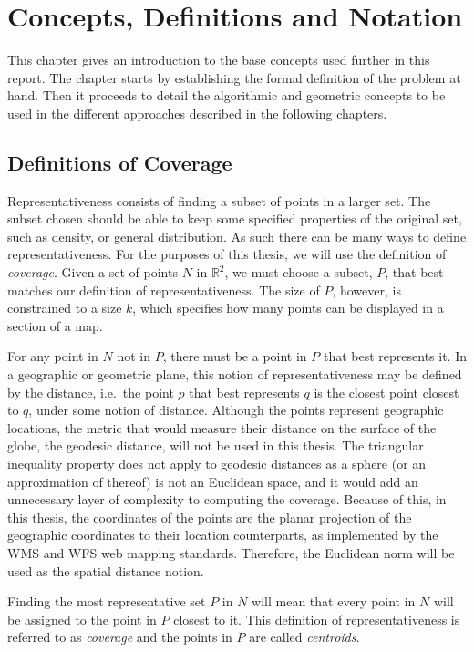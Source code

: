 \chapter{Concepts, Definitions and Notation}
\label{chap:theory}
This chapter gives an introduction to the base concepts used further in this report.
The chapter starts by establishing the formal definition of the problem at hand. 
Then it proceeds to detail the algorithmic and geometric concepts to be used in the different approaches described in the following chapters.
\section{Definitions of Coverage}
\label{sect:problem}
Representativeness consists of finding a subset of points in a larger set. The subset chosen should be able to keep some specified properties of the original set, such as density, or general distribution. As such there can be many ways to define representativeness. For the purposes of this thesis, we will use the definition of \emph{coverage}.
Given a set of points $N$ in $\mathbb{R}^2$, we must choose a subset, $P$, that best matches our definition of representativeness. The size of $P$, however, is constrained to a size $k$, which specifies how many points can be displayed in a section of a map.

For any point in $N$ not in $P$, there must be a point in $P$ that best represents it. In a geographic or geometric plane, this notion of representativeness may be defined by the distance, i.e.\ the point $p$ that best represents $q$ is the closest point closest to $q$, under some notion of distance. 
Although the points represent geographic locations, the metric that would measure their distance on the surface of the globe, the geodesic distance, will not be used in this thesis. The triangular inequality property does not apply to geodesic distances as a sphere (or an approximation of thereof) is not an Euclidean space, and it would add an unnecessary layer of complexity to computing the coverage.
Because of this, in this thesis, the coordinates of the points are the planar projection of the geographic coordinates to their location counterparts, as implemented by the WMS and WFS web mapping standards. Therefore, the Euclidean norm will be used as the spatial distance notion. 

Finding the most representative set $P$ in $N$ will mean that every point in $N$ will be assigned to the point in $P$ closest to it. This definition of representativeness is referred to as \emph{coverage} and the points in $P$ are called \emph{centroids}.

